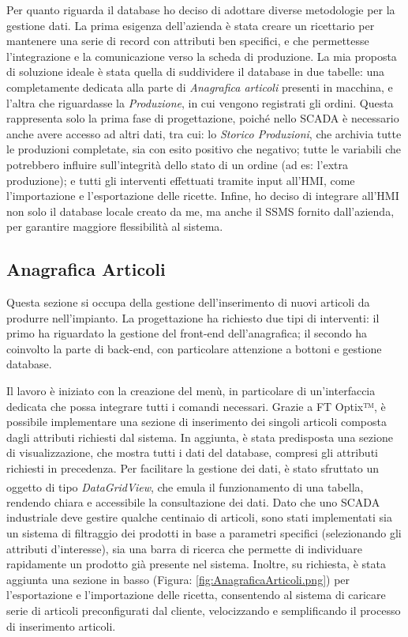 Per quanto riguarda il database ho deciso di adottare diverse metodologie per la gestione dati. La prima esigenza dell'azienda è stata creare un ricettario per mantenere una serie di record con attributi ben specifici, e che permettesse l'integrazione e la comunicazione verso la scheda di produzione. La mia proposta di soluzione ideale è stata quella di suddividere il database in due tabelle: una completamente dedicata alla parte di \textit{Anagrafica articoli} presenti in macchina, e l'altra che riguardasse la \textit{Produzione}, in cui vengono registrati gli ordini. Questa rappresenta solo la prima fase di progettazione, poiché nello SCADA è necessario anche avere accesso ad altri dati, tra cui: lo \textit{Storico Produzioni}, che archivia tutte le produzioni completate, sia con esito positivo che negativo; tutte le variabili che potrebbero influire sull'integrità dello stato di un ordine (ad es: l'extra produzione); e tutti gli interventi effettuati tramite input all'HMI, come l'importazione e l'esportazione delle ricette. Infine, ho deciso di integrare all'HMI non solo il database locale creato da me, ma anche il SSMS fornito dall'azienda, per garantire maggiore flessibilità al sistema.

\subsection{Anagrafica Articoli} 
Questa sezione si occupa della gestione dell'inserimento di nuovi articoli da produrre nell'impianto. La progettazione ha richiesto due tipi di interventi: il primo ha riguardato la gestione del front-end dell'anagrafica; il secondo ha coinvolto la parte di back-end, con particolare attenzione a bottoni e gestione database. 

Il lavoro è iniziato con la creazione del menù, in particolare di un'interfaccia dedicata che possa integrare tutti i comandi necessari. Grazie a FT Optix™, è possibile implementare una sezione di inserimento dei singoli articoli composta dagli attributi richiesti dal sistema. In aggiunta, è stata predisposta una sezione di visualizzazione, che mostra tutti i dati del database, compresi gli attributi richiesti in precedenza. Per facilitare la gestione dei dati, è stato sfruttato un oggetto di tipo \textit{DataGridView}\textsuperscript{\cite{factorytalk_datagrid_example}}, che emula il funzionamento di una tabella, rendendo chiara e accessibile la consultazione dei dati. Dato che uno SCADA industriale deve gestire qualche centinaio di articoli, sono stati implementati sia un sistema di filtraggio dei prodotti in base a parametri specifici (selezionando gli attributi d'interesse), sia una barra di ricerca che permette di individuare rapidamente un prodotto già presente nel sistema. Inoltre, su richiesta, è stata aggiunta una sezione in basso (Figura: \ref{fig:AnagraficaArticoli.png}) per l'esportazione e l'importazione delle ricetta, consentendo al sistema di caricare serie di articoli preconfigurati dal cliente, velocizzando e semplificando il processo di inserimento articoli.

